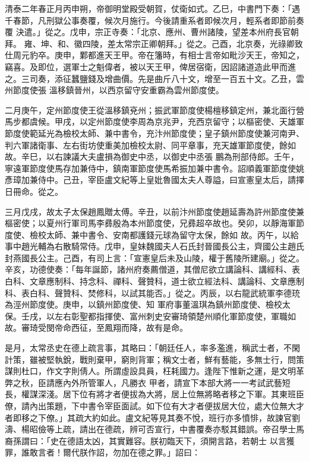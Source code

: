 
\begin{pinyinscope}
清泰二年春正月丙申朔，帝御明堂殿受朝賀，仗衛如式。乙巳，中書門下奏：「遇千春節，凡刑獄公事奏覆，候次月施行。今後請重系者即候次月，輕系者即節前奏覆
 決遣。」從之。戊申，宗正寺奏：「北京、應州、曹州諸陵，望差本州府長官朝拜。
 雍、坤、和、徽四陵，差太常宗正卿朝拜。」從之。己酉，北京奏，光祿卿致仕周元豹卒。庚申，鄴都進天王甲。帝在籓時，有相士言帝如毗沙天王，帝知之，竊喜。及即位，選軍士之魁偉者，被以天王甲，俾居宿衛，因詔諸道造此甲而進之。三司奏，添征蠶鹽錢及增曲價。先是曲斤八十文，增至一百五十文。乙丑，雲州節度使張
 溫移鎮晉州，以西京留守安重霸為雲州節度使。



 二月庚午，定州節度使王從溫移鎮兗州；振武軍節度使楊檀移鎮定州，兼北面行營馬步都虞候。甲戌，以定州節度使李周為京兆尹，充西京留守；以樞密使、天雄軍節度使範延光為檢校太師、兼中書令，充汴州節度使；皇子鎮州節度使兼河南尹、判六軍諸衛事、左右街坊使重美加檢校太尉、同平章事，充天雄軍節度使，餘如故。辛巳，以右諫議大夫盧損為御史中丞，以御史中丞張
 鵬為刑部侍郎。壬午，寧遠軍節度使馬存加兼侍中，鎮南軍節度使馬希振加兼中書令。詔順義軍節度使姚彥璋加兼侍中。己丑，宰臣盧文紀等上皇妣魯國太夫人尊謚，曰宣憲皇太后，請擇日冊命。從之。



 三月戊戌，故太子太保趙鳳贈太傅。辛丑，以前汴州節度使趙延壽為許州節度使兼樞密使；以夏州行軍司馬李彞殷為本州節度使，兄彞超卒故也。癸卯，以靜海軍節度使、檢校太師、兼中書令、安南都護錢元球為留守太保，餘如
 故。丙午，以給事中趙光輔為右散騎常侍。戊申，皇妹魏國夫人石氏封晉國長公主，齊國公主趙氏封燕國長公主。己酉，有司上言：「宣憲皇后未及山陵，權于舊陵所建廟。」從之。辛亥，功德使奏：「每年誕節，諸州府奏薦僧道，其僧尼欲立講論科、講經科、表白科、文章應制科、持念科、禪科、聲贊科，道士欲立經法科、講論科、文章應制科、表白科、聲贊科、焚修科，以試其能否。」從之。丙辰，以右龍武統軍李德珫為涇州節度使。庚申，以鎮州節度使、知
 軍府事董溫琪為鎮州節度使、檢校太保。壬戌，以左右彰聖都指揮使、富州刺史安審琦領楚州順化軍節度使，軍職如故。審琦受閔帝命西征，至鳳翔而降，故有是命。



 是月，太常丞史在德上疏言事，其略曰：「朝廷任人，率多濫進，稱武士者，不閑計策，雖被堅執銳，戰則棄甲，窮則背軍；稱文士者，鮮有藝能，多無士行，問策謀則杜口，作文字則倩人。所謂虛設具員，枉耗國力。逢陛下惟新之運，是文明革弊之秋，臣請應內外所管軍人，凡勝衣
 甲者，請宣下本部大將一一考試武藝短長，權謀深淺。居下位有將才者便拔為大將，居上位無將略者移之下軍。其東班臣僚，請內出策題，下中書令宰臣面試。如下位有大才者便拔居大位，處大位無大才者即移之下僚。」其疏大約如此。盧文紀等見其奏不悅，班行亦多憤悱，故諫官劉濤、楊昭儉等上疏，請出在德疏，辨可否宣行，中書覆奏亦駁其錯誤。帝召學士馬裔孫謂曰：「史在德語太凶，其實難容。朕初臨天下，須開言路，若朝士
 以言獲罪，誰敢言者！爾代朕作詔，勿加在德之罪。」詔曰：




\end{pinyinscope}
